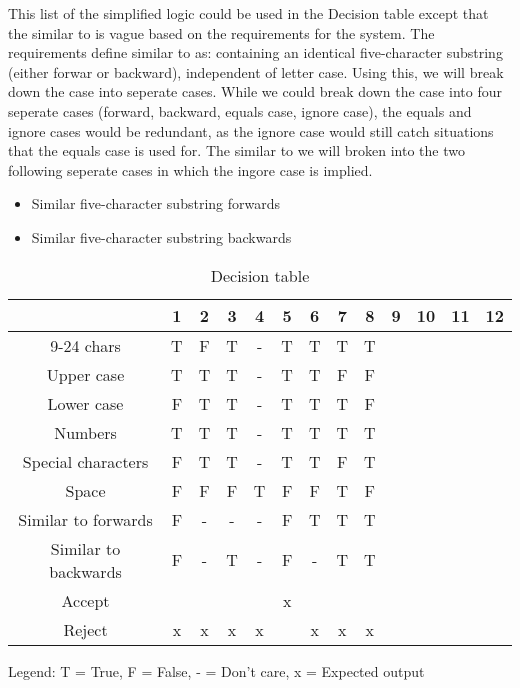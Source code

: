 \documentclass[12pt,letterpaper]{article}
\begin{document}
This list of the simplified logic could be used in the Decision table except that the similar to is vague based on the
requirements for the system. The requirements define similar to as: containing an identical five-character
substring (either forwar or backward), independent of letter case.
Using this, we will break down the case into seperate cases. While we could break down the case into
four seperate cases (forward, backward, equals case, ignore case), the equals and
ignore cases would be redundant, as the ignore case would still catch situations that the equals
case is used for. The similar to we will broken into the two following seperate cases in which the ingore case is implied.
\begin{itemize}
\item Similar five-character substring forwards
\item Similar five-character substring backwards
\end{itemize}

\begin{table}[h]
  \begin{center}
    \caption{Decision table}
    \label{tab:Main table}
    
    \begin{tabular}{c|c|c|c|c|c|c|c|c|c|c|c|c}
    & 1 & 2 & 3 & 4 & 5 & 6 & 7 & 8 & 9 & 10 & 11 & 12\\
    \hline
    9-24 chars & T & F & T & - & T & T & T & T & & & & \\
    \hline
    Upper case & T & T & T & - & T & T & F & F & & & & \\
    \hline
    Lower case & F & T & T & - & T & T & T & F & & & & \\
    \hline
    Numbers & T & T & T & - & T & T & T & T & & & & \\
    \hline
    Special characters & F & T & T & - & T & T & F & T & & & & \\
    \hline
    Space & F & F & F & T & F & F & T & F & & & & \\
    \hline 
    Similar to forwards & F & - & - & - & F & T & T & T & & & & \\
    \hline
    Similar to backwards & F & - & T & - & F & - & T & T & & & & \\
    \midrule
    Accept & & & & & x & & & & & & & \\
    \hline
    Reject & x & x & x & x & & x & x & x & & & & \\
    \end{tabular}
    
    Legend: T = True, F = False, - = Don't care, x = Expected output
  \end{center}
\end{table}
\end{document}

